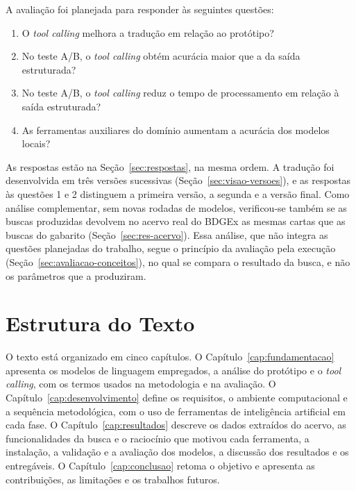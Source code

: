 A avaliação foi planejada para responder às seguintes questões:
\begin{enumerate}
  \item O \textit{tool calling} melhora a tradução em relação ao protótipo?
  \item No teste A/B, o \textit{tool calling} obtém acurácia maior que a da saída estruturada?
  \item No teste A/B, o \textit{tool calling} reduz o tempo de processamento em relação à saída estruturada?
  \item As ferramentas auxiliares do domínio aumentam a acurácia dos modelos locais?
\end{enumerate}

As respostas estão na Seção~\ref{sec:respostas}, na mesma ordem. A tradução foi desenvolvida em três versões sucessivas (Seção~\ref{sec:visao-versoes}), e as respostas às questões 1 e 2 distinguem a primeira versão, a segunda e a versão final. Como análise complementar, sem novas rodadas de modelos, verificou-se também se as buscas produzidas devolvem no acervo real do BDGEx as mesmas cartas que as buscas do gabarito (Seção~\ref{sec:res-acervo}). Essa análise, que não integra as questões planejadas do trabalho, segue o princípio da avaliação pela execução (Seção~\ref{sec:avaliacao-conceitos}), no qual se compara o resultado da busca, e não os parâmetros que a produziram.

\section{Estrutura do Texto}
\label{sec:estrutura}

O texto está organizado em cinco capítulos. O Capítulo~\ref{cap:fundamentacao} apresenta os modelos de linguagem empregados, a análise do protótipo e o \textit{tool calling}, com os termos usados na metodologia e na avaliação. O Capítulo~\ref{cap:desenvolvimento} define os requisitos, o ambiente computacional e a sequência metodológica, com o uso de ferramentas de inteligência artificial em cada fase. O Capítulo~\ref{cap:resultados} descreve os dados extraídos do acervo, as funcionalidades da busca e o raciocínio que motivou cada ferramenta, a instalação, a validação e a avaliação dos modelos, a discussão dos resultados e os entregáveis. O Capítulo~\ref{cap:conclusao} retoma o objetivo e apresenta as contribuições, as limitações e os trabalhos futuros.
